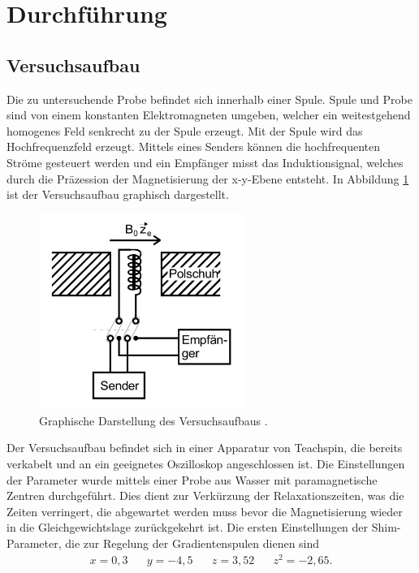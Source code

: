 \section{Durchführung}
\label{sec:Durchführung}
\subsection{Versuchsaufbau}
Die zu untersuchende Probe befindet sich innerhalb einer Spule. Spule und
Probe sind von einem konstanten Elektromagneten umgeben, welcher ein weitestgehend
homogenes Feld senkrecht zu der Spule erzeugt. Mit der Spule wird das
Hochfrequenzfeld erzeugt. Mittels eines Senders können die hochfrequenten Ströme
gesteuert werden und ein Empfänger misst das Induktionsignal, welches durch die
 Präzession der Magnetisierung der x-y-Ebene entsteht.
 In Abbildung \ref{fig:Aufbau} ist der Versuchsaufbau graphisch dargestellt.
 \begin{figure}[H]
 \centering
 \includegraphics[width=0.6\textwidth]{pics/Aufbau.png}
 \caption{Graphische Darstellung des Versuchsaufbaus \cite{Anleitung}.}
 \label{fig:Aufbau}
\end{figure}
Der Versuchsaufbau befindet sich in einer Apparatur von Teachspin, die
bereits verkabelt und an ein geeignetes Oszilloskop angeschlossen ist. Die Einstellungen
der Parameter wurde mittels einer Probe aus Wasser mit paramagnetische Zentren
durchgeführt. Dies dient zur Verkürzung der Relaxationszeiten, was die Zeiten
verringert, die abgewartet werden muss bevor die Magnetisierung wieder in
die Gleichgewichtslage zurückgekehrt ist.
Die ersten Einstellungen der Shim-Parameter, die zur Regelung der Gradientenspulen
dienen sind
\begin{align*}
  x = 0,3 \hspace{20pt} y=-4,5  \hspace{20pt} z=3,52  \hspace{20pt} z^2=-2,65 .
\end{align*}

